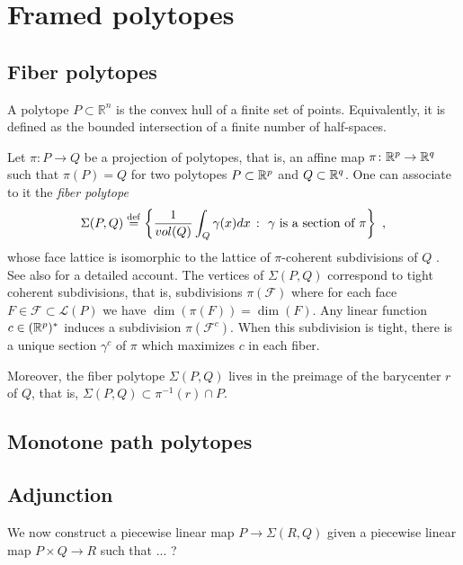 
\section{Framed polytopes}


\subsection{Fiber polytopes}

A polytope $P \subset \mathbb{R}^n$ is the convex hull of a finite set of points.
Equivalently, it is defined as the bounded intersection of a finite number of half-spaces.

Let $\pi \colon P \to Q$ be a projection of polytopes, that is, an affine map $\pi \colon \mathbb{R}^p \to \mathbb{R}^q$ such that $\pi(P)=Q$ for two polytopes $P\subset \mathbb{R}^p$ and $Q \subset \mathbb{R}^q$.
One can associate to it the \emph{fiber polytope} \[\Sigma(P,Q) \stackrel{\mathrm{def}}{=} \left\{ \frac{1}{vol(Q)}\int_Q \gamma(x)dx \ \colon \ \gamma \text{ is a section of }\pi \right\} \ , \] whose face lattice is isomorphic to the lattice of $\pi$-coherent subdivisions of $Q$ \cite{BilleraSturmfels92}.
See also \cite[Chapter 9]{Ziegler95} for a detailed account.
The vertices of $\Sigma(P,Q)$ correspond to tight coherent subdivisions, that is, subdivisions $\pi(\mathcal{F})$ where for each face $F \in \mathcal{F}\subset\mathcal{L}(P)$ we have $\dim(\pi(F))=\dim(F)$.
Any linear function $c\in (\mathbb{R}^p)^{*}$ induces a subdivision $\pi(\mathcal{F}^c)$.
When this subdivision is tight, there is a unique section $\gamma^c$ of $\pi$ which maximizes $c$ in each fiber.

Moreover, the fiber polytope $\Sigma(P,Q)$ lives in the preimage of the barycenter $r$ of $Q$, that is, $\Sigma(P,Q)\subset\pi^{-1}(r)\cap P$.

\subsection{Monotone path polytopes}


\subsection{Adjunction}

We now construct a piecewise linear map $P \to \Sigma(R,Q)$ given a piecewise linear map $P \times Q \to R$ such that ... ?

